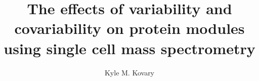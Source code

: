 \documentclass[12pt]{report}
\begin{document}
\title{The effects of variability and covariability on protein modules using single cell mass spectrometry}
\author{Kyle M. Kovary}
 

\beforepreface


\afterpreface






\onlinesignature
\end{document}

